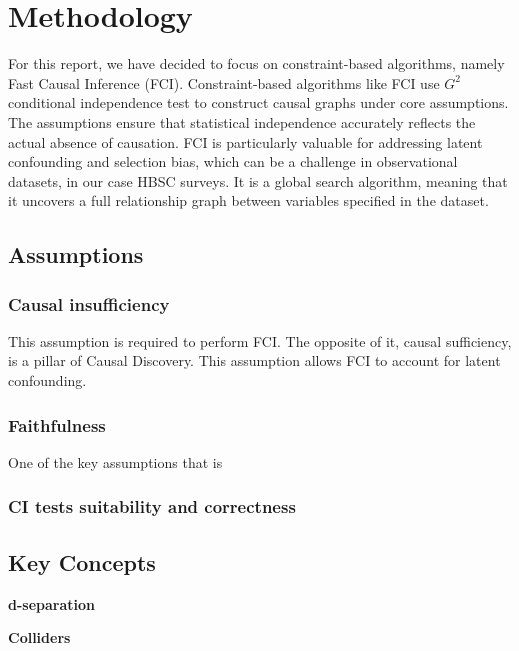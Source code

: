 \documentclass[main.tex]{subfiles}
\begin{document}
\section{Methodology}
For this report, we have decided to focus on constraint-based algorithms, namely Fast Causal Inference (FCI). Constraint-based algorithms like FCI use $G^2$ conditional independence test to construct causal graphs under core assumptions. The assumptions ensure that statistical independence accurately reflects the actual absence of causation. FCI is particularly valuable for addressing latent confounding and selection bias, which can be a challenge in observational datasets, in our case HBSC surveys. It is a global search algorithm, meaning that it uncovers a full relationship graph between variables specified in the dataset. 
\subsection{Assumptions}
\subsubsection*{Causal insufficiency}
This assumption is required to perform FCI. The opposite of it, causal sufficiency, is a pillar of Causal Discovery. This assumption allows FCI to account for latent confounding. 
\subsubsection*{Faithfulness}
One of the key assumptions that is 

\subsubsection*{CI tests suitability and correctness}

\subsection{Key Concepts}

\textbf{d-separation}

\textbf{Colliders}
\end{document}
